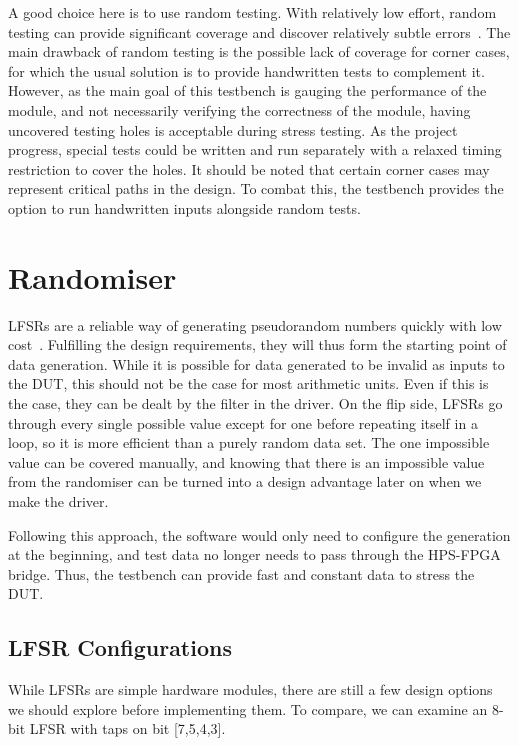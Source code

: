 A good choice here is to use random testing.
With relatively low effort, random testing can provide significant coverage and discover relatively subtle errors~\cite{Duran1}.
The main drawback of random testing is the possible lack of coverage for corner cases, for which the usual solution is to provide handwritten tests to complement it.
However, as the main goal of this testbench is gauging the performance of the module, and not necessarily verifying the correctness of the module, having uncovered testing holes is acceptable during stress testing.
As the project progress, special tests could be written and run separately with a relaxed timing restriction to cover the holes.
It should be noted that certain corner cases may represent critical paths in the design.
To combat this, the testbench provides the option to run handwritten inputs alongside random tests.

\section{Randomiser}

LFSRs are a reliable way of generating pseudorandom numbers quickly with low cost~\cite{Hazwani1}.
Fulfilling the design requirements, they will thus form the starting point of data generation.
While it is possible for data generated to be invalid as inputs to the DUT, this should not be the case for most arithmetic units.
Even if this is the case, they can be dealt by the filter in the driver.
On the flip side, LFSRs go through every single possible value except for one before repeating itself in a loop, so it is more efficient than a purely random data set.
The one impossible value can be covered manually, and knowing that there is an impossible value from the randomiser can be turned into a design advantage later on when we make the driver.

Following this approach, the software would only need to configure the generation at the beginning, and test data no longer needs to pass through the HPS-FPGA bridge.
Thus, the testbench can provide fast and constant data to stress the DUT.

\subsection{LFSR Configurations}

While LFSRs are simple hardware modules, there are still a few design options we should explore before implementing them.
To compare, we can examine an 8-bit LFSR with taps on bit [7,5,4,3].

